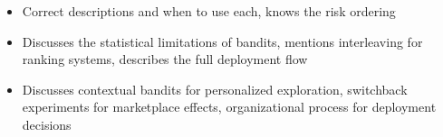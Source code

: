 \begin{interviewq}
\goodgreat
\begin{itemize}
    \item {} Correct descriptions and when to use each, knows the risk ordering
    \item {} Discusses the statistical limitations of bandits, mentions interleaving for ranking systems, describes the full deployment flow
    \item {} Discusses contextual bandits for personalized exploration, switchback experiments for marketplace effects, organizational process for deployment decisions
\end{itemize}

\end{interviewq}


